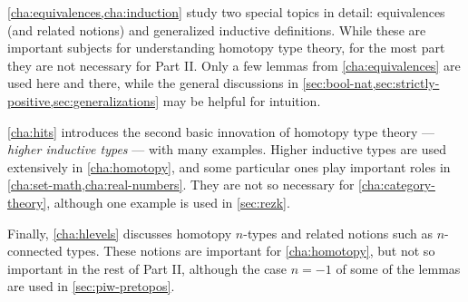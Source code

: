 \autoref{cha:equivalences,cha:induction} study two special topics in detail: equivalences (and related notions) and generalized inductive definitions.
While these are important subjects for understanding homotopy type theory, for the most part they are not necessary for Part II.
Only a few lemmas from \autoref{cha:equivalences} are used here and there, while the general discussions in \autoref{sec:bool-nat,sec:strictly-positive,sec:generalizations} may be helpful for intuition.

\autoref{cha:hits} introduces the second basic innovation of homotopy type theory --- \emph{higher inductive types} --- with many examples.
Higher inductive types are used extensively in \autoref{cha:homotopy}, and some particular ones play important roles in \autoref{cha:set-math,cha:real-numbers}.
They are not so necessary for \autoref{cha:category-theory}, although one example is used in \autoref{sec:rezk}.

Finally, \autoref{cha:hlevels} discusses homotopy $n$-types and related notions such as $n$-connected types.
These notions are important for \autoref{cha:homotopy}, but not so important in the rest of Part II, although the case $n=-1$ of some of the lemmas are used in \autoref{sec:piw-pretopos}.



